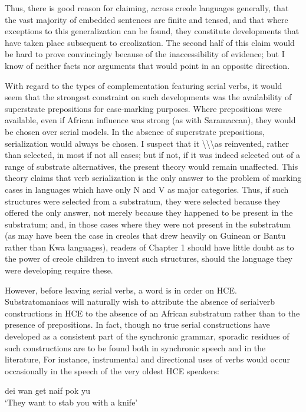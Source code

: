 Thus, there is good reason for claiming, across creole languages generally, that the vast majority of embedded sentences are finite and tensed, and that where exceptions to this generalization can be found, they constitute developments that have taken place subsequent to creolization. The second half of this claim would be hard to prove con\-vincingly because of the inaccessibility of evidence; but I know of neither facts nor arguments that would point in an opposite direction.

With regard to the types of complementation featuring serial verbs, it would seem that the strongest constraint on such develop\-ments was the availability of superstrate prepositions for case-marking purposes. Where prepositions were available, even if African influence was strong (as with Saramaccan), they would be chosen over serial models. In the absence of superstrate prepositions, serialization would always be chosen. I suspect that it {\textbackslash}{\textbackslash}{\textbackslash}as reinvented, rather than selected,
in most if not all cases; but if not, if it was indeed selected out of a range of substrate alternatives, the present theory would remain un\-affected. This theory claims that verb serialization is the only answer to the problem of marking cases in languages which have only N and V as major categories. Thus, if such structures were selected from a substratum, they were selected because they offered the only answer, not merely because they happened to be present in the substratum; and, in those cases where they were not present in the substratum (as may have been the case in creoles that drew heavily on Guinean or Bantu rather than Kwa languages), readers of Chapter 1 should have little doubt as to the power of creole children to invent such structures, should the language they were developing require these.

However, before leaving serial verbs, a word is in order on HCE. Substratomaniacs will naturally wish to attribute the absence of serial\-verb constructions in HCE to the absence of an African substratum rather than to the presence of prepositions. In fact, though no true serial constructions have developed as a consistent part of the syn\-chronic grammar, sporadic residues of such constructions are to be found both in synchronic speech and in the literature, For instance, instrumental and directional uses of verbs would occur occasionally in the speech of the very oldest HCE speakers:

\ea\label{ex:2:263}
 dei wan get naif pok yu\\
\glt `They want to stab you with a knife'
\z



